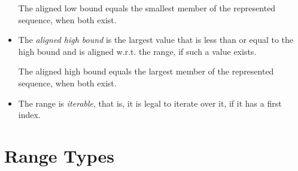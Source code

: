 \begin{itemize}
  The aligned low bound equals the smallest member of the represented
  sequence, when both exist.

\item The \emph{aligned high bound} is the largest value that is
  less than or equal to the high bound and is aligned w.r.t. the range,
  if such a value exists.

  The aligned high bound equals the largest member of the represented
  sequence, when both exist.

%

\item The range is \emph{iterable}, that is, it is legal to iterate over it,
  if it has a first index.

\end{itemize}



\section{Range Types}
\label{Range_Types}


